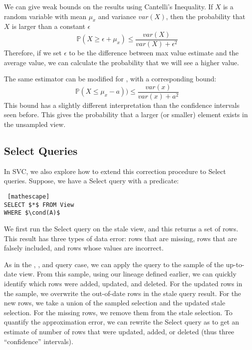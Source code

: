 We can give weak bounds on the results using Cantelli's Inequality.
If $X$ is a random variable with mean $\mu_x$ and variance $var(X)$, then the probability that $X$ is larger than a constant $\epsilon$ 
\[
\mathbb{P}(X \ge \epsilon + \mu_x ) \le \frac{var(X)}{var(X) + \epsilon^2}
\]
Therefore, if we set $\epsilon$ to be the difference between max value estimate and the average value, we can calculate the probability that we will see a higher value. 

The same estimator can be modified for \minfunc, with a corresponding bound:
\[
\mathbb{P}(X \le \mu_x - a )) \le \frac{var(x)}{var(x) + a^2}
\]
This bound has a slightly different interpretation than the confidence intervals seen before.
This gives the probability that a larger (or smaller) element exists in the unsampled view.
\fi

\iffalse
\begin{proposition} (BOOTSTRAP OVER DIFFERENCES) Let q be an aggregate query that has an unbiased sample estimate, and let $\hat{S}$ and $\hat{S'}$ be sample views as defined before. 
One sample of the bootstrap estimator $s$ is defined as the difference of q applied to random subsample of size $b_1$ (with replacement) of $\hat{S}$ and $\hat{S'}$.
We denote subsamples of the samples as $\hat{S'}_{sub}$ and $\hat{S}_{sub}$ respectively.
\[q(\hat{S'}_{sub}) - q(\hat{S}_{sub})\]
To build the confidence interval, we repeatedly apply this procedure $b_2$ times.
\end{proposition}
\fi


\subsection{Select Queries}
In SVC, we also explore how to extend this correction procedure to Select queries.
Suppose, we have a Select query with a predicate:
\begin{lstlisting} [mathescape]
SELECT $*$ FROM View 
WHERE $\cond(A)$
\end{lstlisting}

We first run the Select query on the stale view, and this returns a set of rows.
This result has three types of data error: rows that are missing, rows that are falsely included, and rows whose values are incorrect.

As in the \sumfunc, \countfunc, and \avgfunc query case, we can apply the query to the sample of the up-to-date view.
From this sample, using our lineage defined earlier, we can quickly identify which rows were added, updated, and deleted.
For the updated rows in the sample, we overwrite the out-of-date rows in the stale query result.
For the new rows, we take a union of the sampled selection and the updated stale selection.
For the missing rows, we remove them from the stale selection.
To quantify the approximation error, we can rewrite the Select query as \countfunc to get an estimate of number of rows that were updated, added, or deleted (thus three ``confidence'' intervals). 



